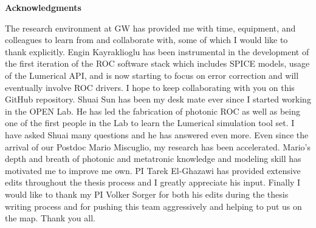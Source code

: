 \clearpage
\begin{centering}
\textbf{Acknowledgments}\\
\vspace{\baselineskip}
\end{centering}

The research environment at GW has provided me with time, equipment, and colleagues to learn from and collaborate with, some of which I would like to thank explicitly. Engin Kayraklioglu has been instrumental in the development of the first iteration of the ROC software stack which includes SPICE models, usage of the Lumerical API, and is now starting to focus on error correction and will eventually involve ROC drivers. I hope to keep collaborating with you on this GitHub repository. Shuai Sun has been my desk mate ever since I started working in the OPEN Lab. He has led the fabrication of photonic ROC as well as being one of the first people in the Lab to learn the Lumerical simulation tool set. I have asked Shuai many questions and he has answered even more. Even since the arrival of our Postdoc Mario Miscuglio, my research has been accelerated. Mario's depth and breath of photonic and metatronic knowledge and modeling skill has motivated me to improve me own. PI Tarek El-Ghazawi has provided extensive edits throughout the thesis process and I greatly appreciate his input. Finally I would like to thank my PI Volker Sorger for both his edits during the thesis writing process and for pushing this team aggressively and helping to put us on the map. Thank you all.

\clearpage
